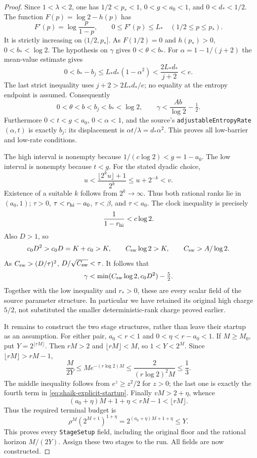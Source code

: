 \documentclass[11pt]{article}
\theoremstyle{remark}\newtheorem{remark}[proposition]{Remark}
\begin{document}
\begin{proof}
Since \(1<\lambda<2\), one has \(1/2<p_*<1\),
\(0<g<a_0<1\), and \(0<d_*<1/2\).
The function \(F(p)=\log2-h(p)\) has
\[
 F'(p)=\log\frac{p}{1-p},\qquad
 0\le F'(p)\le L_* \quad (1/2\le p\le p_*).
\]
It is strictly increasing on \((1/2,p_*]\).
As \(F(1/2)=0\) and \(h(p_*)>0\),
\(0<b_*<\log2\).
The hypothesis on \(\gamma\) gives \(0<\theta<b_*\).
For \(\alpha=1-1/(j+2)\) the mean-value estimate gives
\begin{equation}\label{eq:shaik-barrier-gap}
 0<b_*-b_j
 \le L_*d_*(1-\alpha^2)
 <\frac{2L_*d_*}{j+2}<e .
\end{equation}
The last strict inequality uses \(j+2>2L_*d_*/e\);
no equality at the entropy endpoint is assumed.
Consequently
\[
 0<\theta<b<b_j<b_*<\log2,\qquad
 \gamma<\frac{Ab}{\log2}-\tfrac12.
\]
Furthermore \(0<t<g<a_0\), \(0<\alpha<1\), and the source's
\texttt{adjustableEntropyRate}\((\alpha,t)\) is exactly \(b_j\):
its displacement is \(\alpha t/\lambda=d_*\alpha^2\).
This proves all low-barrier and low-rate conditions.

The high interval is nonempty because
\(1/(c\log2)<g=1-a_0\).
The low interval is nonempty because \(t<g\).
For the stated dyadic choice,
\[
 u<\frac{\lfloor2^ku\rfloor+1}{2^k}
 \le u+2^{-k}<v.
\]
Existence of a suitable \(k\) follows from \(2^k\to\infty\).
Thus both rational ranks lie in \((a_0,1)\);
\(\tau>0\), \(\tau<r_{\rm hi}-a_0\),
\(\tau<\beta\), and \(\tau<a_0\).
The clock inequality is precisely
\[
 \frac1{1-r_{\rm hi}}<c\log2.
\]
Also \(D>1\), so
\[
 c_0D^2>c_0D=K+c_0>K,\qquad
 C_{\rm sw}\log2>K,\qquad C_{\rm sw}>A/\log2.
\]
As \(C_{\rm sw}>(D/\tau)^2\),
\(D/\sqrt{C_{\rm sw}}<\tau\).
It follows that
\[
 \gamma<
 \min(C_{\rm sw}\log2,c_0D^2)-\tfrac52.
\]
Together with the low inequality and \(r_*>0\), these are every
scalar field of the source parameter structure. In particular we
have retained its original high charge \(5/2\), not substituted
the smaller deterministic-rank charge proved earlier.

It remains to construct the two stage structures, rather than
leave their startup as an assumption. For either pair,
\(a_0<r<1\) and \(0<\eta<r-a_0<1\).
If \(M\ge M_0\), put \(Y=2^{\lfloor rM\rfloor}\).
Then \(rM>2\) and \(\lfloor rM\rfloor<M\), so \(1<Y<2^M\).
Since \(\lfloor rM\rfloor>rM-1\),
\[
 \frac{M}{2Y}\le M e^{-(r\log2)M}
 \le\frac{2}{(r\log2)^2M}\le\frac13 .
\]
The middle inequality follows from \(e^z\ge z^2/2\) for \(z>0\);
the last one is exactly the fourth term in
\eqref{eq:shaik-explicit-startup}.
Finally \(vM>2+\eta\), whence
\[
 (a_0+\eta)M+1+\eta<rM-1<\lfloor rM\rfloor.
\]
Thus the required terminal budget is
\[
 \rho^M(2^{M+1})^{1+\eta}
 =2^{(a_0+\eta)M+1+\eta}\le Y.
\]
This proves every \texttt{StageSetup} field, including the original
floor and the rational horizon \(M/(2Y)\). Assign these two stages
to the run. All fields are now constructed.
\end{proof}
\end{document}
